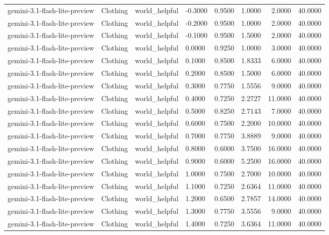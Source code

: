 \begin{table}
\begin{tabular}{llllrrrr}
gemini-3.1-flash-lite-preview & Clothing & world_helpful & -0.3000 & 0.9500 & 1.0000 & 2.0000 & 40.0000 \\
gemini-3.1-flash-lite-preview & Clothing & world_helpful & -0.2000 & 0.9500 & 1.0000 & 2.0000 & 40.0000 \\
gemini-3.1-flash-lite-preview & Clothing & world_helpful & -0.1000 & 0.9500 & 1.5000 & 2.0000 & 40.0000 \\
gemini-3.1-flash-lite-preview & Clothing & world_helpful & 0.0000 & 0.9250 & 1.0000 & 3.0000 & 40.0000 \\
gemini-3.1-flash-lite-preview & Clothing & world_helpful & 0.1000 & 0.8500 & 1.8333 & 6.0000 & 40.0000 \\
gemini-3.1-flash-lite-preview & Clothing & world_helpful & 0.2000 & 0.8500 & 1.5000 & 6.0000 & 40.0000 \\
gemini-3.1-flash-lite-preview & Clothing & world_helpful & 0.3000 & 0.7750 & 1.5556 & 9.0000 & 40.0000 \\
gemini-3.1-flash-lite-preview & Clothing & world_helpful & 0.4000 & 0.7250 & 2.2727 & 11.0000 & 40.0000 \\
gemini-3.1-flash-lite-preview & Clothing & world_helpful & 0.5000 & 0.8250 & 2.7143 & 7.0000 & 40.0000 \\
gemini-3.1-flash-lite-preview & Clothing & world_helpful & 0.6000 & 0.7500 & 2.2000 & 10.0000 & 40.0000 \\
gemini-3.1-flash-lite-preview & Clothing & world_helpful & 0.7000 & 0.7750 & 3.8889 & 9.0000 & 40.0000 \\
gemini-3.1-flash-lite-preview & Clothing & world_helpful & 0.8000 & 0.6000 & 3.7500 & 16.0000 & 40.0000 \\
gemini-3.1-flash-lite-preview & Clothing & world_helpful & 0.9000 & 0.6000 & 5.2500 & 16.0000 & 40.0000 \\
gemini-3.1-flash-lite-preview & Clothing & world_helpful & 1.0000 & 0.7500 & 2.7000 & 10.0000 & 40.0000 \\
gemini-3.1-flash-lite-preview & Clothing & world_helpful & 1.1000 & 0.7250 & 2.6364 & 11.0000 & 40.0000 \\
gemini-3.1-flash-lite-preview & Clothing & world_helpful & 1.2000 & 0.6500 & 2.7857 & 14.0000 & 40.0000 \\
gemini-3.1-flash-lite-preview & Clothing & world_helpful & 1.3000 & 0.7750 & 3.5556 & 9.0000 & 40.0000 \\
gemini-3.1-flash-lite-preview & Clothing & world_helpful & 1.4000 & 0.7250 & 3.6364 & 11.0000 & 40.0000 \\

\end{tabular}
\end{table}
